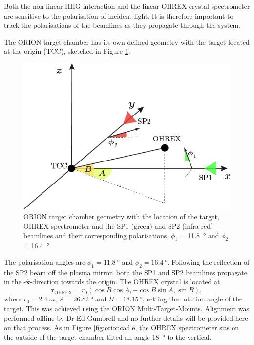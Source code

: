 Both the non-linear HHG interaction and the linear OHREX crystal spectrometer are sensitive to the polarisation of incident light. It is therefore important to track the polarisations of the beamlines as they propagate through the system.

The ORION target chamber has its own defined geometry with the target located at the origin (\ac{TCC}), sketched in Figure \ref{fig:miscoriontargetchambergeometry}.
\begin{figure}
	\centering
	\includegraphics[width=0.7\linewidth]{figures/misc/misc_ORION_target_chamber_geometry}
	\caption[ORION target chamber geometry]{ORION target chamber geometry with the location of the target, OHREX spectrometer and the SP1 (green) and SP2 (infra-red) beamlines and their corresponding polarisations, $\phi_1$ = \qty{11.8}{\degree} and $\phi_2$ = \qty{16.4}{\degree}.}
	\label{fig:miscoriontargetchambergeometry}
\end{figure}
The polarisation angles are $\phi_1 = \qty{11.8}{\degree}$ and $\phi_2 = \qty{16.4}{\degree}$. Following the reflection of the SP2 beam off the plasma mirror, both the SP1 and SP2 beamlines propagate in the -$\hat{\mathbf{x}}$-direction towards the origin. The OHREX crystal is located at 
\begin{equation}
	\mathbf{r}_\mathrm{OHREX} = r_0(\cos B\cos A,-\cos B\sin A, \sin B),
\end{equation}
where $r_0 = \qty{2.4}{m}$, $A = \qty{26.82} {\degree} $ and $B = \qty{18.15}{\degree}$, setting the rotation angle of the target. This was achieved using the ORION Multi-Target-Mounts. Alignment was performed offline by Dr Ed Gumbrell and no further details will be provided here on that process. As in Figure \ref{fig:orioncad}e, the OHREX spectrometer sits on the outside of the target chamber tilted an angle \qty{18}{\degree} to the vertical.

